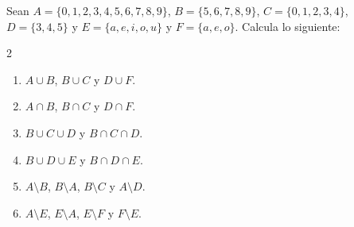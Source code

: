 \documentclass[12pt,a4paper]{article}
\begin{document}
    \begin{problema}
        Sean $A=\{0,1,2,3,4,5,6,7,8,9\}$, $B=\{5,6,7,8,9\}$, $C=\{0,1,2,3,4\}$, $D=\{3,4,5\}$ y
        $E=\{a,e,i,o,u\}$ y $F=\{a,e,o\}$. Calcula lo siguiente:
        \begin{multicols}{2}
            \begin{enumerate}
                \item[(a)] $A\cup B$, $B\cup C$ y $D\cup F$.
                \item[(b)] $A\cap B$, $B\cap C$ y $D\cap F$. 
                \item[(c)] $B\cup C\cup D$ y $B\cap C\cap D$.
                \item[(d)] $B\cup D\cup E$ y $B\cap D\cap E$.
                \item[(e)] $A\setminus B$, $B\setminus A$, $B\setminus C$ y $A\setminus D$.  
                \item[(f)] $A\setminus E$, $E\setminus A$, $E\setminus F$ y $F\setminus E$. 
            \end{enumerate}
        \end{multicols}
    \end{problema}
\end{document}
